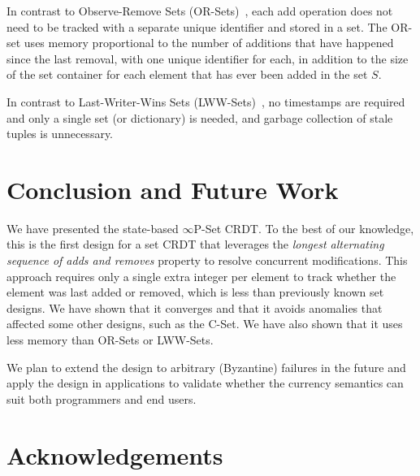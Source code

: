 \documentclass[11pt, oneside]{article}   	%
\begin{document}
In contrast to Observe-Remove Sets (OR-Sets)~\cite{shapiro:inria-00555588}, each add operation does not need to be tracked with a separate unique identifier and stored in a set. The OR-set uses memory proportional to the number of additions that have happened since the last removal, with one unique identifier for each, in addition to the size of the set container for each element that has ever been added in the set $S$.

In contrast to Last-Writer-Wins Sets (LWW-Sets)~\cite{shapiro:inria-00555588}, no timestamps are required and only a single set (or dictionary) is needed, and garbage collection of stale tuples is unnecessary.

%
%
%


\section{Conclusion and Future Work}
\label{sec:conclusion}

We have presented the state-based $\infty$P-Set CRDT. To the best of our knowledge, this is the first design for a set CRDT that leverages the \textit{longest alternating sequence of adds and removes} property to resolve concurrent modifications. This approach requires only a single extra integer per element to track whether the element was last added or removed, which is less than previously known set designs. We have shown that it converges and that it avoids anomalies that affected some other designs, such as the C-Set. We have also shown that it uses less memory than OR-Sets or LWW-Sets.

We plan to extend the design to arbitrary (Byzantine) failures in the future and apply the design in applications to validate whether the currency semantics can suit both programmers and end users.

\section{Acknowledgements}
\label{sec:acknowledgements}
\end{document}
